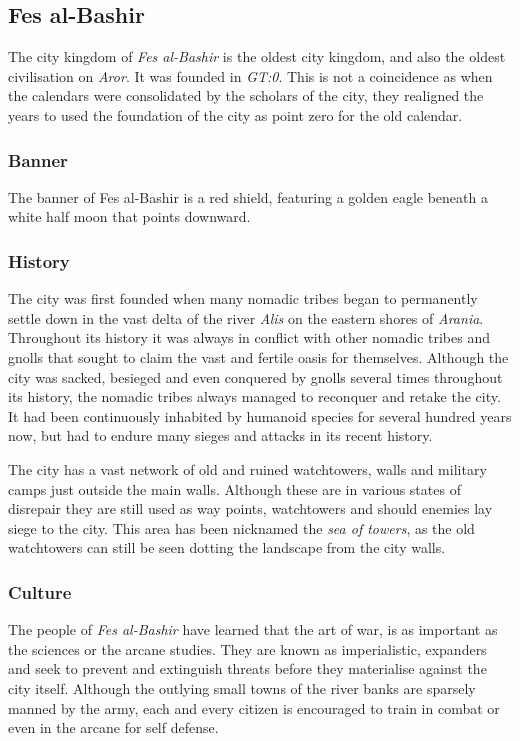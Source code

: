 \subsection{Fes al-Bashir}

The city kingdom of \emph{Fes al-Bashir} is the oldest city kingdom, and also
the oldest civilisation on \emph{Aror}. It was founded in \emph{GT:0}. This
is not a coincidence as when the calendars were consolidated by the scholars
of the city, they realigned the years to used the foundation of the city as
point zero for the old calendar.

\subsubsection*{Banner}

The banner of Fes al-Bashir is a red shield, featuring a golden eagle beneath
a white half moon that points downward.

\subsubsection*{History}

The city was first founded when many nomadic tribes began to permanently
settle down in the vast delta of the river \emph{Alis} on the eastern shores
of \emph{Arania}. Throughout its history it was always in conflict with other
nomadic tribes and gnolls that sought to claim the vast and fertile oasis for
themselves. Although the city was sacked, besieged and even conquered by
gnolls several times throughout its history, the nomadic tribes always managed
to reconquer and retake the city. It had been continuously inhabited by
humanoid species for several hundred years now, but had to endure many sieges
and attacks in its recent history.

The city has a vast network of old and ruined watchtowers, walls and military
camps just outside the main walls. Although these are in various states of
disrepair they are still used as way points, watchtowers and should enemies
lay siege to the city. This area has been nicknamed the \emph{sea of towers},
as the old watchtowers can still be seen dotting the landscape from the city
walls.

\subsubsection*{Culture}

The people of \emph{Fes al-Bashir} have learned that the art of war, is as
important as the sciences or the arcane studies. They are known as
imperialistic, expanders and seek to prevent and extinguish threats before
they materialise against the city itself. Although the outlying small towns of
the river banks are sparsely manned by the army, each and every citizen is
encouraged to train in combat or even in the arcane for self defense.

